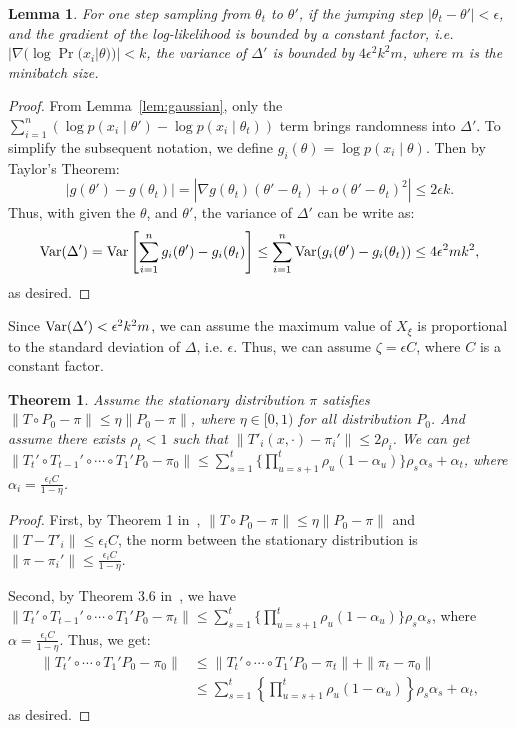 \documentclass{article}
\newtheorem{lemma}{Lemma}
\newtheorem{theorem}{Theorem}
\begin{document}
\begin{lemma}
For one step sampling from $\theta_t$ to $\theta'$, if the jumping step  $|\theta_t - \theta'| <
\epsilon$, and the gradient of the log-likelihood is bounded by a constant factor, i.e. $|\nabla
(\log \Pr(x_i| \theta))| < k$, the variance of $\Delta'$ is bounded by $4\epsilon^2 k^2 m$, where
$m$ is the minibatch size.
\end{lemma}

\begin{proof}
From Lemma~\ref{lem:gaussian}, only the $\sum_{i=1}^n (\log p(x_i\mid \theta') - \log p(x_i\mid
\theta_t))$ term brings randomness into $\Delta'$. To simplify the subsequent notation, we define
$g_i(\theta) = \log p(x_i\mid \theta)$. Then by Taylor's Theorem:
\[
|g(\theta') - g(\theta_t)| = |\nabla g(\theta_t) (\theta' - \theta_t) + o(\theta' - \theta_t)^2| \leq 2\epsilon k.
\]
Thus, with given the $\theta$, and $\theta'$, the variance of $\Delta'$ can be write as:
\[
{\rm Var}(\Delta') = {\rm Var}\left[\sum_{i=1}^n g_i(\theta') - g_i(\theta_t)\right] \leq
\sum_{i=1}^n  {\rm Var}(g_i(\theta') - g_i(\theta_t)) \leq  4\epsilon^2 m k^2,
\]
as desired.
\end{proof}

Since ${\rm Var}(\Delta') < \epsilon^2 k^2 m $, we can assume the maximum value of $X_{\xi}$ is
proportional to the standard deviation of $\Delta$, i.e. $\epsilon$. Thus, we can assume
$\zeta=\epsilon C$, where $C$ is a constant factor.

\begin{theorem}
Assume the stationary distribution $\pi$ satisfies $\|T \circ P_0 - \pi\| \leq \eta \|P_0 - \pi\|$,
where $\eta \in [0, 1)$ for all distribution $P_0$. And assume there exists $\rho_t < 1$ such that
$\|T'_i(x, \cdot) - \pi_i'\| \leq 2\rho_i$. We can get $\| T_t' \circ T_{t-1}' \circ \cdots \circ T_1' P_0
- \pi_0 \| \leq \sum_{s=1}^t \{\prod _{u=s+1}^t \rho_u (1-\alpha_u)\} \rho_s \alpha_s + \alpha_t $,
where $\alpha_i = \frac{\epsilon_i C }{1-\eta}$.
\end{theorem}

\begin{proof}
First, by Theorem 1 in~\cite{cutting_mh_2014}, $\|T \circ P_0 - \pi\| \leq \eta \|P_0
- \pi\|$ and $\|T-T'_i\| \leq \epsilon_i C$, the norm between the stationary distribution is $\|\pi
- \pi_i'\|\leq \frac{\epsilon_i C}{1-\eta}$.

Second, by Theorem 3.6 in~\cite{yang2013sequential}, we have  $\| T_t' \circ T_{t-1}' \circ \cdots
\circ T_1' P_0 - \pi_t \| \leq \sum_{s=1}^t \{\prod _{u=s+1}^t \rho_u (1-\alpha_u)\} \rho_s
\alpha_s$, where $\alpha = \frac{\epsilon_i C}{1-\eta}$. Thus, we get:
\begin{align*}
 \| T_t' \circ \cdots \circ T_1' P_0 - \pi_0 \| &\leq \|T_t' \circ \cdots \circ T_1' P_0 - \pi_t\| + \|\pi_t - \pi_0\| \\
 &\leq \sum_{s=1}^t \left\{\prod _{u=s+1}^t \rho_u (1-\alpha_u)\right\} \rho_s \alpha_s + \alpha_t,
\end{align*}
as desired.
\end{proof}
\end{document}

